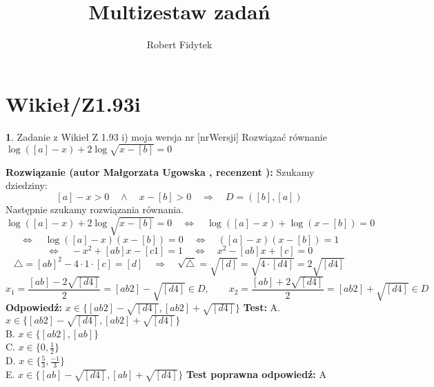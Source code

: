 \documentclass[12pt, a4paper]{article}
\title{Multizestaw zadań}
\author{Robert Fidytek}
\date{}
\theoremstyle{definition} %
\newtheorem{zad}{}
\newcommand{\kategoria}[1]{\section{#1}} %
\newcommand{\zadStart}[1]{\begin{zad}#1\newline} %
\newcommand{\zadStop}{\end{zad}}   %
\newcommand{\rozwStart}[2]{\noindent \textbf{Rozwiązanie (autor #1 , recenzent #2): }\newline} %
\newcommand{\rozwStop}{\newline}                                            %
\newcommand{\odpStart}{\noindent \textbf{Odpowiedź:}\newline}    %
\newcommand{\odpStop}{\newline}                                             %
\newcommand{\testStart}{\noindent \textbf{Test:}\newline} %
\newcommand{\testStop}{\newline} %
\newcommand{\kluczStart}{\noindent \textbf{Test poprawna odpowiedź:}\newline} %
\newcommand{\kluczStop}{\newline} %
\begin{document}
\maketitle


\kategoria{Wikieł/Z1.93i}
\zadStart{Zadanie z Wikieł Z 1.93 i) moja wersja nr [nrWersji]}
Rozwiązać równanie $\log{([a]-x)} + 2\log{\sqrt{x-[b]}} = 0$
\zadStop
\rozwStart{Małgorzata Ugowska}{}
Szukamy dziedziny:
$$[a]-x>0 \quad \land \quad x-[b] >0 \quad \Longrightarrow \quad D = ([b], [a])$$
Następnie szukamy rozwiązania równania.
$$\log{([a]-x)} + 2\log{\sqrt{x-[b]}} = 0 \quad \Longleftrightarrow \quad \log{([a]-x)} + \log{(x-[b])} = 0 $$
$$ \Longleftrightarrow \quad \log{([a]-x)(x-[b])} = 0 \quad \Longleftrightarrow \quad ([a]-x)(x-[b]) =1 $$
$$ \Longleftrightarrow \quad -x^2 +[ab]x-[c1]=1 \quad \Longleftrightarrow \quad x^2 -[ab]x+[c]=0 $$
$$ \bigtriangleup = [ab]^2-4 \cdot 1 \cdot [c] = [d] \quad  \Longrightarrow \quad \sqrt{\bigtriangleup}=\sqrt{[d]} = \sqrt{4 \cdot [d4]} = 2 \sqrt{[d4]}$$
$$ x_1=\frac{[ab]-2 \sqrt{[d4]}}{2} = [ab2]-\sqrt{[d4]} \in D, \qquad x_2=\frac{[ab]+2 \sqrt{[d4]}}{2} = [ab2]+\sqrt{[d4]} \in D$$
\rozwStop
\odpStart
$x \in \{[ab2]-\sqrt{[d4]}, [ab2]+\sqrt{[d4]}\}$
\odpStop
\testStart
A. $x \in \{[ab2]-\sqrt{[d4]}, [ab2]+\sqrt{[d4]}\}$\\
B. $x \in \{[ab2], [ab]\}$\\
C. $x \in \{0, \frac{1}{2}\}$\\
D. $x \in \{\frac{5}{3}, \frac{-1}{3}\}$\\
E. $x \in \{[ab]-\sqrt{[d4]}, [ab]+\sqrt{[d4]}\}$
\testStop
\kluczStart
A
\kluczStop
\end{document}

